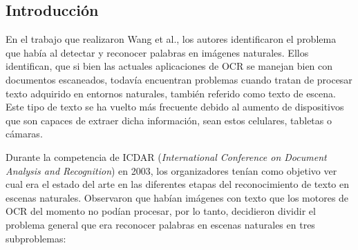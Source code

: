 \subsection{Introducción}

	En el trabajo que realizaron Wang et al., los autores identificaron el problema que había al detectar y reconocer palabras en imágenes naturales. Ellos identifican, que si bien las actuales aplicaciones de OCR se manejan bien con documentos escaneados, todavía encuentran problemas cuando tratan de procesar texto adquirido en entornos naturales, también referido como texto de escena. Este tipo de texto se ha vuelto más frecuente debido al aumento de dispositivos que son capaces de extraer dicha información, sean estos celulares, tabletas o cámaras.
	
	Durante la competencia de ICDAR (\textit{International Conference on Document Analysis and Recognition}) en 2003, los organizadores tenían como objetivo ver cual era el estado del arte en las diferentes etapas del reconocimiento de texto en escenas naturales. Observaron que habían imágenes con texto que los motores de OCR del momento no podían procesar, por lo tanto, decidieron dividir el problema general que era reconocer palabras en escenas naturales en tres subproblemas:
	
